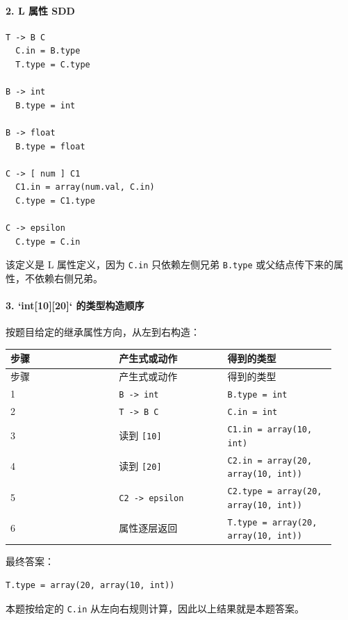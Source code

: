 \documentclass[UTF8]{ctexart}
\begin{document}
\paragraph*{2. L 属性 SDD}

\begin{Verbatim}[fontsize=\small,breaklines=true]
T -> B C
  C.in = B.type
  T.type = C.type

B -> int
  B.type = int

B -> float
  B.type = float

C -> [ num ] C1
  C1.in = array(num.val, C.in)
  C.type = C1.type

C -> epsilon
  C.type = C.in
\end{Verbatim}

该定义是 L 属性定义，因为 \texttt{C.in} 只依赖左侧兄弟 \texttt{B.type} 或父结点传下来的属性，不依赖右侧兄弟。

\paragraph*{3. `int[10][20]` 的类型构造顺序}

按题目给定的继承属性方向，从左到右构造：

\begin{longtable}{|p{0.31\linewidth}|p{0.31\linewidth}|p{0.31\linewidth}|}
\hline
步骤 & 产生式或动作 & 得到的类型 \\
\hline
\endfirsthead
步骤 & 产生式或动作 & 得到的类型 \\
\hline
\endhead
1 & \texttt{B -> int} & \texttt{B.type = int} \\
\hline
2 & \texttt{T -> B C} & \texttt{C.in = int} \\
\hline
3 & 读到 \texttt{[10]} & \texttt{C1.in = array(10, int)} \\
\hline
4 & 读到 \texttt{[20]} & \texttt{C2.in = array(20, array(10, int))} \\
\hline
5 & \texttt{C2 -> epsilon} & \texttt{C2.type = array(20, array(10, int))} \\
\hline
6 & 属性逐层返回 & \texttt{T.type = array(20, array(10, int))} \\
\hline
\end{longtable}

最终答案：

\begin{Verbatim}[fontsize=\small,breaklines=true]
T.type = array(20, array(10, int))
\end{Verbatim}

本题按给定的 \texttt{C.in} 从左向右规则计算，因此以上结果就是本题答案。
\end{document}
